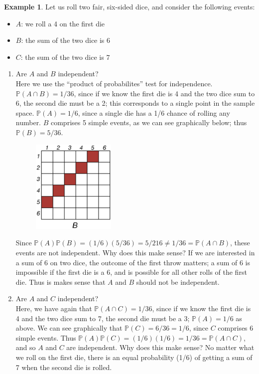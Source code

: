 \documentclass[12pt]{article}
\theoremstyle{definition}
\newtheorem*{example}{Example}
\theoremstyle{remark}
\def\P{{\mathbb P}}
\begin{document}
\begin{example}
Let us roll two fair, six-sided dice, and consider the following events:
\begin{itemize}
\item $A$: we roll a 4 on the first die
\item $B$: the sum of the two dice is 6
\item $C$: the sum of the two dice is 7
\end{itemize}
\begin{enumerate}
\item Are $A$ and $B$ independent? \\

Here we use the ``product of probabilites'' test for independence. $\P(A \cap B) = 1/36$, since if we know the first die is 4 and the two dice sum to 6, the second die must be a 2; this corresponds to a single point in the sample space. $\P(A) = 1/6$, since a single die has a 1/6 chance of rolling any number. $B$ comprises 5 simple events, as we can see graphically below; thus $\P(B) = 5/36$. 
\begin{figure}[H]
\centering
\includegraphics[width=4cm]{2dice2.eps}
\end{figure}
Since $\P(A)\P(B) = (1/6)(5/36) = 5/216 \neq 1/36 = \P(A \cap B)$, these events are not independent. Why does this make sense? If we are interested in a sum of 6 on two dice, the outcome of the first throw matters; a sum of 6 is impossible if the first die is a 6, and is possible for all other rolls of the first die. Thus is makes sense that $A$ and $B$ should not be independent.

\item Are $A$ and $C$ independent? \\

Here, we have again that $\P(A \cap C) = 1/36$, since if we know the first die is 4 and the two dice sum to 7, the second die must be a 3; $\P(A) = 1/6$ as above. We can see graphically that $\P(C) = 6/36 = 1/6$, since $C$ comprises 6 simple events. Thus $\P(A)\P(C) = (1/6)(1/6) = 1/36 = \P(A \cap C)$, and so $A$ and $C$ are independent. Why does this make sense? No matter what we roll on the first die, there is an equal probability (1/6) of getting a sum of 7 when the second die is rolled.
\end{enumerate}
\end{example}
\end{document}
